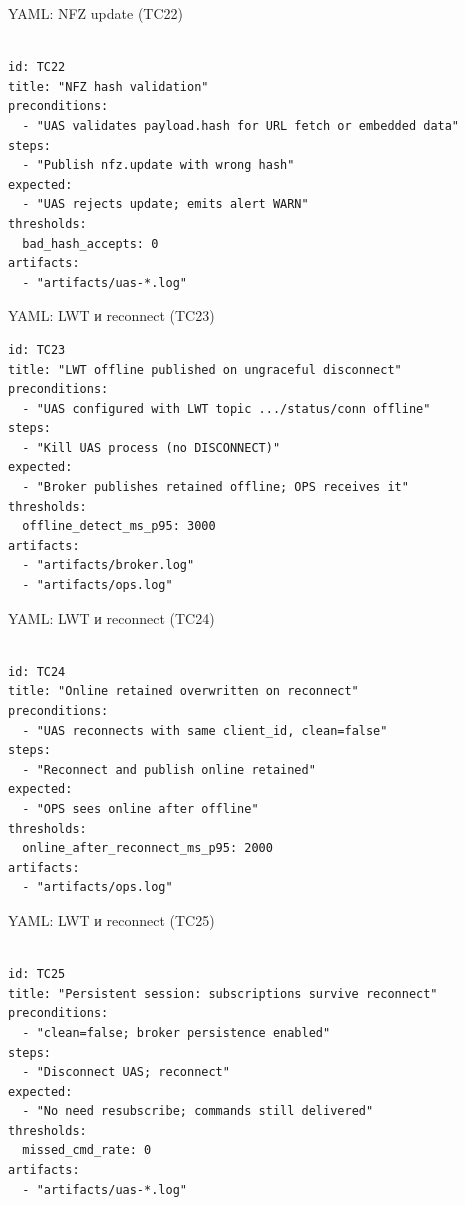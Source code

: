 \documentclass[aspectratio=169]{beamer}
\begin{document}
\begin{frame}[fragile]{YAML: NFZ update (TC22)}
\begin{Verbatim}[fontsize=\scriptsize, baselinestretch=0.85]

id: TC22
title: "NFZ hash validation"
preconditions:
  - "UAS validates payload.hash for URL fetch or embedded data"
steps:
  - "Publish nfz.update with wrong hash"
expected:
  - "UAS rejects update; emits alert WARN"
thresholds:
  bad_hash_accepts: 0
artifacts:
  - "artifacts/uas-*.log"
\end{Verbatim}
\end{frame}

\begin{frame}[fragile]{YAML: LWT и reconnect (TC23)}
\begin{Verbatim}[fontsize=\scriptsize, baselinestretch=0.85]
id: TC23
title: "LWT offline published on ungraceful disconnect"
preconditions:
  - "UAS configured with LWT topic .../status/conn offline"
steps:
  - "Kill UAS process (no DISCONNECT)"
expected:
  - "Broker publishes retained offline; OPS receives it"
thresholds:
  offline_detect_ms_p95: 3000
artifacts:
  - "artifacts/broker.log"
  - "artifacts/ops.log"
\end{Verbatim}
\end{frame}

\begin{frame}[fragile]{YAML: LWT и reconnect (TC24)}
\begin{Verbatim}[fontsize=\scriptsize, baselinestretch=0.85]

id: TC24
title: "Online retained overwritten on reconnect"
preconditions:
  - "UAS reconnects with same client_id, clean=false"
steps:
  - "Reconnect and publish online retained"
expected:
  - "OPS sees online after offline"
thresholds:
  online_after_reconnect_ms_p95: 2000
artifacts:
  - "artifacts/ops.log"
\end{Verbatim}
\end{frame}

\begin{frame}[fragile]{YAML: LWT и reconnect (TC25)}
\begin{Verbatim}[fontsize=\scriptsize, baselinestretch=0.85]

id: TC25
title: "Persistent session: subscriptions survive reconnect"
preconditions:
  - "clean=false; broker persistence enabled"
steps:
  - "Disconnect UAS; reconnect"
expected:
  - "No need resubscribe; commands still delivered"
thresholds:
  missed_cmd_rate: 0
artifacts:
  - "artifacts/uas-*.log"
\end{Verbatim}
\end{frame}
\end{document}
